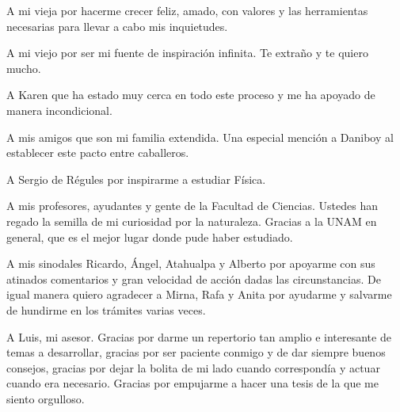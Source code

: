 A mi vieja por hacerme crecer feliz, amado, con valores y las herramientas necesarias para llevar a cabo mis inquietudes. 

A mi viejo por ser mi fuente de inspiración infinita. Te extraño y te quiero mucho.

A Karen que ha estado muy cerca en todo este proceso y me ha apoyado de manera incondicional. 

A mis amigos que son mi familia extendida. Una especial mención a Daniboy al establecer este pacto entre caballeros. 

A Sergio de Régules por inspirarme a estudiar Física.

A mis profesores, ayudantes y gente de la Facultad de Ciencias. Ustedes han regado la semilla de mi curiosidad por la naturaleza. Gracias a la UNAM en general, que es el mejor lugar donde pude haber estudiado.

A mis sinodales Ricardo, Ángel, Atahualpa y Alberto por apoyarme con sus atinados comentarios y gran velocidad de acción dadas las circunstancias. De igual manera quiero agradecer a Mirna, Rafa y Anita por ayudarme y salvarme de hundirme en los trámites varias veces. 

A Luis, mi asesor. Gracias por darme un repertorio tan amplio e interesante de temas a desarrollar, gracias por ser paciente conmigo y de dar siempre buenos consejos, gracias por dejar la bolita de mi lado cuando correspondía y actuar cuando era necesario. Gracias por empujarme a hacer una tesis de la que me siento orgulloso. 


